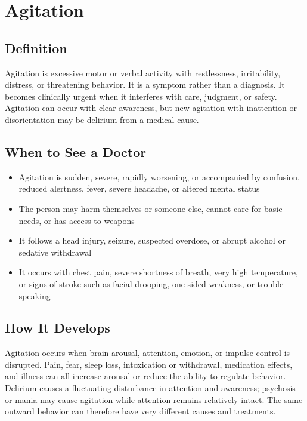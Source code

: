 \chapter{Agitation}

\section*{Definition}
Agitation is excessive motor or verbal activity with restlessness, irritability, distress, or threatening behavior. It is a symptom rather than a diagnosis. It becomes clinically urgent when it interferes with care, judgment, or safety. Agitation can occur with clear awareness, but new agitation with inattention or disorientation may be delirium from a medical cause.

\section*{When to See a Doctor}

\begin{itemize}
 \item Agitation is sudden, severe, rapidly worsening, or accompanied by confusion, reduced alertness, fever, severe headache, or altered mental status
 \item The person may harm themselves or someone else, cannot care for basic needs, or has access to weapons
 \item It follows a head injury, seizure, suspected overdose, or abrupt alcohol or sedative withdrawal
 \item It occurs with chest pain, severe shortness of breath, very high temperature, or signs of stroke such as facial drooping, one-sided weakness, or trouble speaking
\end{itemize}

\section*{How It Develops}
Agitation occurs when brain arousal, attention, emotion, or impulse control is disrupted. Pain, fear, sleep loss, intoxication or withdrawal, medication effects, and illness can all increase arousal or reduce the ability to regulate behavior. Delirium causes a fluctuating disturbance in attention and awareness; psychosis or mania may cause agitation while attention remains relatively intact. The same outward behavior can therefore have very different causes and treatments.

